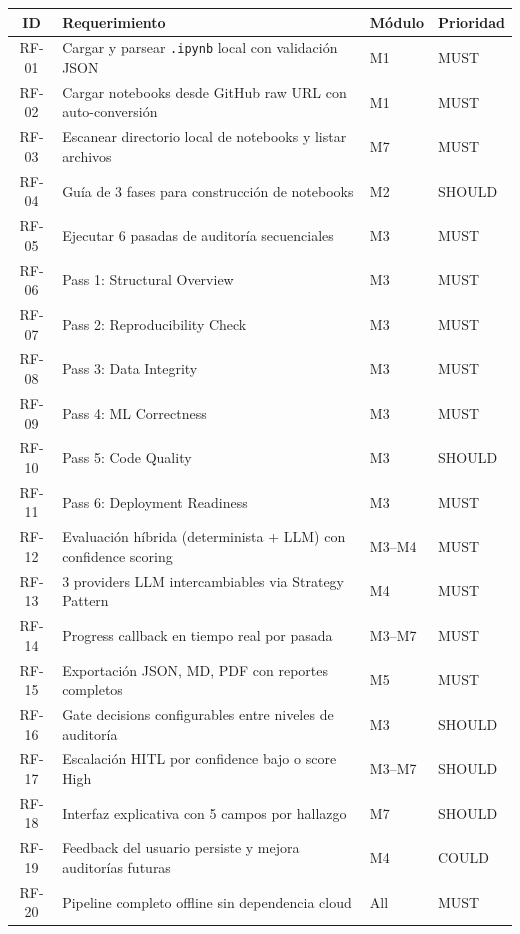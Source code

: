 \documentclass[12pt,a4paper]{article}
\begin{document}
\begin{longtable}{clll}
\toprule
\textbf{ID} & \textbf{Requerimiento} & \textbf{Módulo} & \textbf{Prioridad} \\
\midrule
\endhead
\bottomrule
\endfoot
RF-01 & Cargar y parsear \texttt{.ipynb} local con validación JSON      & M1 & MUST \\
RF-02 & Cargar notebooks desde GitHub raw URL con auto-conversión        & M1 & MUST \\
RF-03 & Escanear directorio local de notebooks y listar archivos          & M7 & MUST \\
RF-04 & Guía de 3 fases para construcción de notebooks                    & M2 & SHOULD \\
RF-05 & Ejecutar 6 pasadas de auditoría secuenciales                       & M3 & MUST \\
RF-06 & Pass 1: Structural Overview                                        & M3 & MUST \\
RF-07 & Pass 2: Reproducibility Check                                      & M3 & MUST \\
RF-08 & Pass 3: Data Integrity                                             & M3 & MUST \\
RF-09 & Pass 4: ML Correctness                                             & M3 & MUST \\
RF-10 & Pass 5: Code Quality                                               & M3 & SHOULD \\
RF-11 & Pass 6: Deployment Readiness                                       & M3 & MUST \\
RF-12 & Evaluación híbrida (determinista + LLM) con confidence scoring     & M3--M4 & MUST \\
RF-13 & 3 providers LLM intercambiables via Strategy Pattern                & M4 & MUST \\
RF-14 & Progress callback en tiempo real por pasada                        & M3--M7 & MUST \\
RF-15 & Exportación JSON, MD, PDF con reportes completos                    & M5 & MUST \\
RF-16 & Gate decisions configurables entre niveles de auditoría            & M3 & SHOULD \\
RF-17 & Escalación HITL por confidence bajo o score High                   & M3--M7 & SHOULD \\
RF-18 & Interfaz explicativa con 5 campos por hallazgo                     & M7 & SHOULD \\
RF-19 & Feedback del usuario persiste y mejora auditorías futuras          & M4 & COULD \\
RF-20 & Pipeline completo offline sin dependencia cloud                    & All & MUST \\
\end{longtable}
\end{document}
